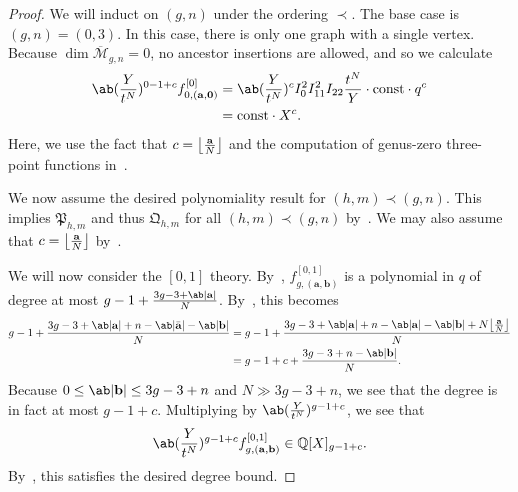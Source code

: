 \documentclass[10pt]{amsart}
\DeclarePairedDelimiter{\floor}{\lfloor}{\rfloor}
\theoremstyle{definition}
\theoremstyle{remark}
\theoremstyle{plain}
\theoremstyle{definition}
\theoremstyle{remark}
\newcommand{\Q}{\mathbb{Q}}
\newcommand{\ba}{\mathbf{a}}
\newcommand{\bb}{\mathbf{b}}
\newcommand{\msc}[1]{\mathscr{#1}}
\newcommand{\mf}[1]{\mathfrak{#1}}
\newcommand{\mbf}[1]{\mathbf{#1}}
\newcommand{\mr}[1]{\mathrm{#1}}
\newcommand{\ol}[1]{\overline{#1}}
\newcommand{\1}{\mathbf{1}}
\newcommand{\2}{\mathbf{2}}
\newcommand{\3}{\mathbf{3}}
\numberwithin{equation}{section}
\begin{document}
\begin{proof}
    We will induct on $(g,n)$ under the ordering $\prec$. The base case is $(g,n) = (0,3)$. In this case, there is only one graph with a single vertex. Because $\dim \ol{\msc{M}}_{g,n} = 0$, no ancestor insertions are allowed, and so we calculate
    \begin{align*}
        \ab(\frac{Y}{t^N})^{0-1+c} f_{0,(\ba,\mbf{0})}^{[0]} &= \ab(\frac{Y}{t^N})^c I_0^2 I_{11}^2 I_{22} \frac{t^N}{Y} \cdot \mr{const} \cdot q^c \\
        &= \mr{const} \cdot X^c.
    \end{align*}
    Here, we use the fact that $c = \floor*{\frac{\ba}{N}}$ and the computation of genus-zero three-point functions in~\cite[\S 2.4]{polynomiality}.

    We now assume the desired polynomiality result for $(h,m) \prec (g,n)$. This implies $\mf{P}_{h,m}$ and thus $\mf{Q}_{h,m}$ for all $(h,m) \prec (g,n)$ by~. We may also assume that $c = \floor*{\frac{\ba}{N}}$ by~. 

    We will now consider the $[0,1]$ theory. By~\cite[Theorem 4.1]{polynomiality}, $f_{g,(\ba,\bb)}^{[0,1]}$ is a polynomial in $q$ of degree at most $g-1+\frac{3g-3 + \ab|\ba|}{N}$. By~, this becomes
    \begin{align*}
        g-1+\frac{3g-3+\ab|\ba|+n-\ab|\bar{\ba}|-\ab|\bb|}{N} &= g-1+\frac{3g-3+\ab|\ba|+n-\ab|\ba|-\ab|\bb|+N\floor*{\frac{\ba}{N}}}{N} \\
        &= g-1+c + \frac{3g-3+n-\ab|\bb|}{N}.
    \end{align*}
    Because $0\leq \ab|\bb| \leq 3g-3+n$ and $N \gg 3g-3+n$, we see that the degree is in fact at most $g-1+c$. Multiplying by $\ab(\frac{Y}{t^N})^{g-1+c}$, we see that
    \[ \ab(\frac{Y}{t^N})^{g-1+c} f_{g,(\ba,\bb)}^{[0,1]} \in \Q[X]_{g-1+c}. \]
    By~, this satisfies the desired degree bound.


\end{proof}
\end{document}

